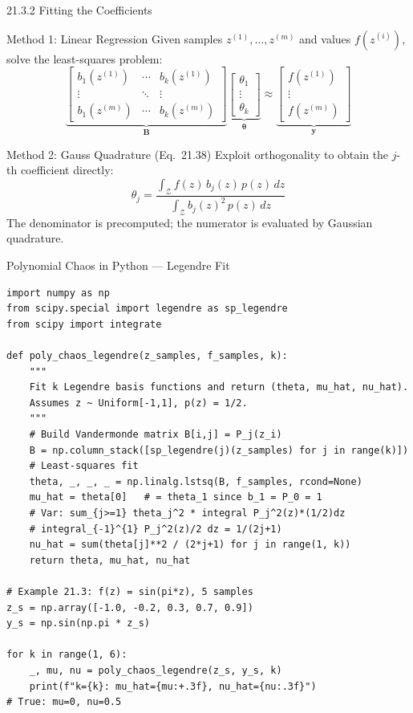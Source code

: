 \documentclass[aspectratio=169,10pt]{beamer}
\begin{document}
\begin{frame}{21.3.2 Fitting the Coefficients}
  \begin{block}{Method 1: Linear Regression}
    Given samples $z^{(1)},\ldots,z^{(m)}$ and values $f(z^{(i)})$,
    solve the least-squares problem:
    \[
      \underbrace{\begin{bmatrix}b_1(z^{(1)}) & \cdots & b_k(z^{(1)})\\
        \vdots & \ddots & \vdots\\
        b_1(z^{(m)}) & \cdots & b_k(z^{(m)})\end{bmatrix}}_{\mathbf{B}}
      \underbrace{\begin{bmatrix}\theta_1\\\vdots\\\theta_k\end{bmatrix}}_{\bm{\theta}}
      \approx
      \underbrace{\begin{bmatrix}f(z^{(1)})\\\vdots\\f(z^{(m)})\end{bmatrix}}_{\mathbf{y}}
    \]
  \end{block}

  \begin{block}{Method 2: Gauss Quadrature (Eq.\ 21.38)}
    Exploit orthogonality to obtain the $j$-th coefficient directly:
    \[
      \theta_j = \frac{\displaystyle\int_{\mathcal{Z}} f(z)\,b_j(z)\,p(z)\,dz}
                      {\displaystyle\int_{\mathcal{Z}} b_j(z)^2\,p(z)\,dz}
    \]
    The denominator is precomputed; the numerator is evaluated by Gaussian quadrature.
  \end{block}
\end{frame}

\begin{frame}[fragile]{Polynomial Chaos in Python --- Legendre Fit}
\begin{lstlisting}
import numpy as np
from scipy.special import legendre as sp_legendre
from scipy import integrate

def poly_chaos_legendre(z_samples, f_samples, k):
    """
    Fit k Legendre basis functions and return (theta, mu_hat, nu_hat).
    Assumes z ~ Uniform[-1,1], p(z) = 1/2.
    """
    # Build Vandermonde matrix B[i,j] = P_j(z_i)
    B = np.column_stack([sp_legendre(j)(z_samples) for j in range(k)])
    # Least-squares fit
    theta, _, _, _ = np.linalg.lstsq(B, f_samples, rcond=None)
    mu_hat = theta[0]   # = theta_1 since b_1 = P_0 = 1
    # Var: sum_{j>=1} theta_j^2 * integral P_j^2(z)*(1/2)dz
    # integral_{-1}^{1} P_j^2(z)/2 dz = 1/(2j+1)
    nu_hat = sum(theta[j]**2 / (2*j+1) for j in range(1, k))
    return theta, mu_hat, nu_hat

# Example 21.3: f(z) = sin(pi*z), 5 samples
z_s = np.array([-1.0, -0.2, 0.3, 0.7, 0.9])
y_s = np.sin(np.pi * z_s)

for k in range(1, 6):
    _, mu, nu = poly_chaos_legendre(z_s, y_s, k)
    print(f"k={k}: mu_hat={mu:+.3f}, nu_hat={nu:.3f}")
# True: mu=0, nu=0.5
\end{lstlisting}
\end{frame}
\end{document}
